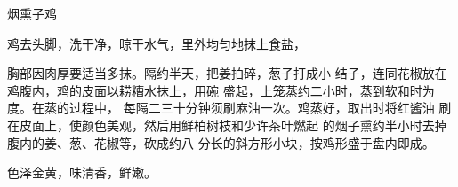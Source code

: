 \begin{recipe}{烟熏子鸡}

\ingredients


\cooking

鸡去头脚，洗干净，晾干水气，里外均匀地抹上食盐，

胸部因肉厚要适当多抹。隔约半天，把姜拍碎，葱子打成小 结子，连同花椒放在鸡腹内，鸡的皮面以耢糟水抹上，用碗 盛起，上笼蒸约二小时，蒸到软和时为度。在蒸的过程中， 每隔二三十分钟须刷麻油一次。鸡蒸好，取出时将红酱油 刷在皮面上，使颜色美观，然后用鲜柏树枝和少许茶叶燃起 的烟子熏约半小时去掉腹内的姜、葱、花椒等，砍成约八 分长的斜方形小块，按鸡形盛于盘内即成。

\notes

色泽金黄，味清香，鲜嫩。

\end{recipe}

